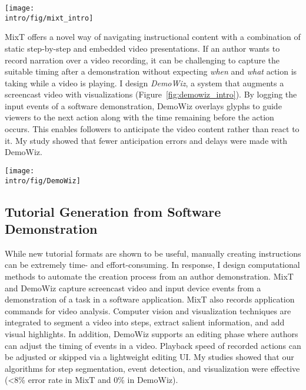 \begin{figure*}[t]
  \centering
  \texttt{[image: \\intro/fig/mixt\_intro]}
  \caption{MixT generates step-by-step tutorials (left) that contain static and video information from task demonstrations. Videos are automatically edited and offer different views (right) to highlight the most relevant screen areas for a step. Visualizing mouse movement helps learners understand a complex action.}
  \label{fig:mixt_intro}
\end{figure*}


MixT offers a novel way of navigating instructional content with a combination of static step-by-step and embedded video presentations. If an author wants to record narration over a video recording, it can be challenging to capture the suitable timing after a demonstration without expecting \emph{when} and \emph{what} action is taking while a video is playing.
%
I design \emph{DemoWiz}, a system that augments a screencast video with visualizations (Figure~\ref{fig:demowiz_intro}). By logging the input events of a software demonstration, DemoWiz overlays glyphs to guide viewers to the next action along with the time remaining before the action occurs. This enables followers to anticipate the video content rather than react to it.
%
My study showed that fewer anticipation errors and delays were made with DemoWiz.

\begin{figure*}[t]
\centering
\texttt{[image: \\intro/fig/DemoWiz]}
\caption{DemoWiz visualizes input events in a screencast video to help viewers anticipate the upcoming event for following a software demonstration.}
\label{fig:demowiz_intro}
\end{figure*}

\subsection{Tutorial Generation from Software Demonstration}

While new tutorial formats are shown to be useful, manually creating instructions can be extremely time- and effort-consuming. In response, I design computational methods to automate the creation process from an author demonstration. MixT and DemoWiz capture screencast video and input device events from a demonstration of a task in a software application. MixT also records application commands for video analysis. Computer vision and visualization techniques are integrated to segment a video into steps, extract salient information, and add visual highlights.
%
In addition, DemoWiz supports an editing phase where authors can adjust the timing of events in a video. Playback speed of recorded actions can be adjusted or skipped via a lightweight editing UI. My studies showed that our algorithms for step segmentation, event detection, and visualization were effective (\textless8\% error rate in MixT and 0\% in DemoWiz).

